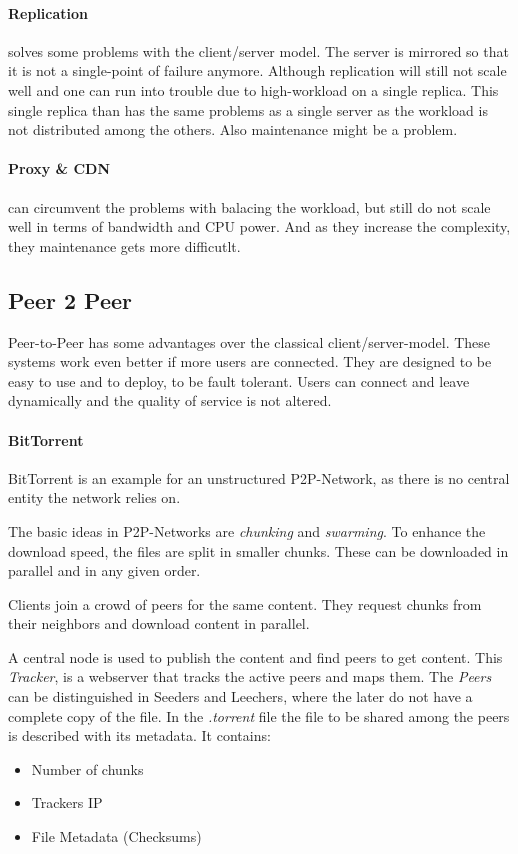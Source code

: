 \paragraph{Replication} %
\label{par:replication}
solves some problems with the client/server model.
The server is mirrored so that it is not a single-point of failure anymore.
Although replication will still not scale well
and one can run into trouble due to high-workload on a single replica.
This single replica than has the same problems as a single server
as the workload is not distributed among the others.
Also maintenance might be a problem.

\paragraph{Proxy \& CDN} %
\label{par:proxy_&_cdn}
can circumvent the problems with balacing the workload,
but still do not scale well in terms of bandwidth and CPU power.
And as they increase the complexity,
they maintenance gets more difficutlt.

\subsection{Peer 2 Peer} %
\label{sub:peer_2_peer}
Peer-to-Peer has some advantages over the classical client/server-model.
These systems work even better if more users are connected.
They are designed to be easy to use and to deploy,
to be fault tolerant.
Users can connect and leave dynamically and the quality of service is not altered.

\paragraph{BitTorrent} %
\label{par:bittorrent}
BitTorrent is an example for an unstructured P2P-Network,
as there is no central entity the network relies on.

The basic ideas in P2P-Networks are \emph{chunking} and \emph{swarming}.
To enhance the download speed,
the files are split in smaller chunks.
These can be downloaded in parallel
and in any given order.

Clients join a crowd of peers for the same content.
They request chunks from their neighbors
and download content in parallel.

A central node is used to publish the content
and find peers to get content.
This \emph{Tracker}, is a webserver that tracks the active peers
and maps them.
The \emph{Peers} can be distinguished in Seeders and Leechers,
where the later do not have a complete copy of the file.
In the \emph{.torrent} file the file to be shared among the peers is described with its metadata.
It contains:\\
\begin{itemize}
	\item Number of chunks
	\item Trackers IP
	\item File Metadata (Checksums)
\end{itemize}

